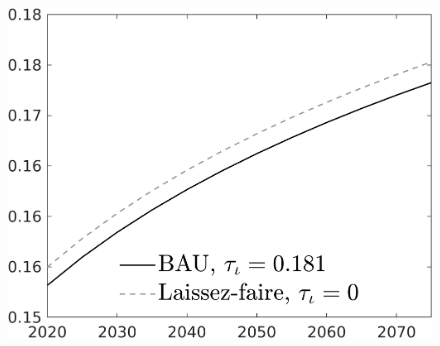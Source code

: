 \documentclass[12pt]{article}
\begin{document}
\begin{figure}[h!!]
\begin{minipage}[]{0.32\textwidth}
	\end{minipage}	
	\begin{minipage}[]{0.32\textwidth}
		\includegraphics[width=1\textwidth]{../../codding_model/own_basedOnFried/optimalPol_010922_revision/figures/all_13Sept22/CompTaul_LFBAU_Reg0_LgLf_spillover0_nsk0_xgr0_knspil0_sep1_countec0_GovRev0_etaa0.79_lgd1.png}
	\end{minipage}	
\end{figure}
\end{document}
